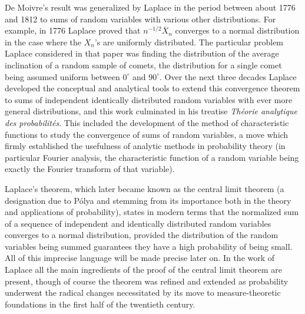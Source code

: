 \documentclass{amsart}
\theoremstyle{definition}
\theoremstyle{remark}
\begin{document}
De Moivre's result was generalized by Laplace in the period between about 1776 and 1812 to sums of random variables with various other distributions. For example, in 1776 Laplace proved that $n^{-1/2} \overline X_n$ converges to a normal distribution in the case where the $X_n$'s are uniformly distributed. The particular problem Laplace considered in that paper was finding the distribution of the average inclination of a random sample of comets, the distribution for a single comet being assumed uniform between $0^\circ$ and $90^\circ$. Over the next three decades Laplace developed the conceptual and analytical tools to extend this convergence theorem to sums of independent identically distributed random variables with ever more general distributions, and this work culminated in his treatise {\em Th\'eorie analytique des probabilit\'es}. This included the development of the method of characteristic functions to study the convergence of sums of random variables, a move which firmly established the usefulness of analytic methods in probability theory (in particular Fourier analysis, the characteristic function of a random variable being exactly the Fourier transform of that variable).

Laplace's theorem, which later became known as the central limit theorem (a designation due to P\'olya and stemming from its importance both in the theory and applications of probability), states in modern terms that the normalized sum of a sequence of independent and identically distributed random variables converges to a normal distribution, provided the distribution of the random variables being summed guarantees they have a high probability of being small. All of this imprecise language will be made precise later on. In the work of Laplace all the main ingredients of the proof of the central limit theorem are present, though of course the theorem was refined and extended as probability underwent the radical changes necessitated by its move to measure-theoretic foundations in the first half of the twentieth century.
\end{document}
